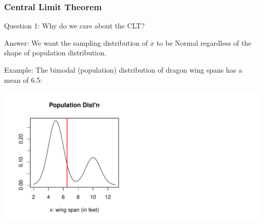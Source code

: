 \documentclass[handout]{beamer}
\newcommand{\blue}[1]{\textcolor{blue2}{#1}}
\newcommand{\xbar}{\overline{x}}
\begin{document}
\begin{frame}
\frametitle{Central Limit Theorem}
\blue{Question 1}:  Why do we care about the CLT?

\vspace{0.25cm}

\pause\blue{Answer}:  We want the sampling distribution of $\xbar$ to be Normal \blue{regardless} of the shape of population distribution.

\vspace{0.25cm}

\pause\blue{Example}:  The bimodal (population) distribution of dragon wing spans has a mean of 6.5:

\pause\begin{center}
\includegraphics[width=\textwidth]{figure/CLT1.pdf}
\end{center}

\end{frame}
\end{document}
